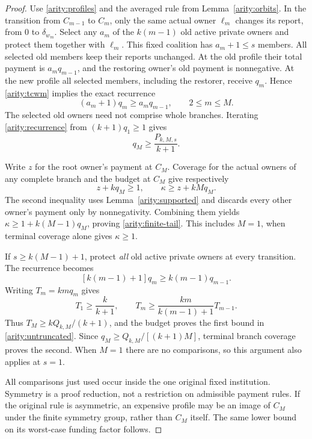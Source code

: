 \documentclass[11pt]{article}
\theoremstyle{definition}\newtheorem{definition}[theorem]{Definition}
\theoremstyle{remark}\newtheorem{remark}[theorem]{Remark}
\begin{document}
\begin{proof}
Use \eqref{arity:profiles} and the averaged rule from
Lemma~\ref{arity:orbits}.  In the transition from $C_{m-1}$ to $C_m$, only
the same actual owner $\ell_m$ changes its report, from $0$ to $\delta_{w_m}$.
Select any $a_m$ of the $k(m-1)$ old active private owners and protect them
together with $\ell_m$.  This fixed coalition has $a_m+1\leq s$ members.
All selected old members keep their reports unchanged.  At the old profile
their total payment is $a_mq_{m-1}$, and the restoring owner's old payment
is nonnegative.  At the new profile all selected members, including the
restorer, receive $q_m$.  Hence \eqref{arity:tcwm} implies the exact recurrence
\begin{equation}
  (a_m+1)q_m\geq a_mq_{m-1},\qquad 2\leq m\leq M.
  \label{arity:recurrence}
\end{equation}
The selected old owners need not comprise whole branches.  Iterating
\eqref{arity:recurrence} from $(k+1)q_1\geq1$ gives
\begin{equation}
  q_M\geq\frac{P_{k,M,s}}{k+1}.
  \label{arity:terminal-q}
\end{equation}

Write $z$ for the root owner's payment at $C_M$.  Coverage for the actual
owners of any complete branch and the budget at $C_M$ give respectively
\[
  z+kq_M\geq1,\qquad
  \kappa\geq z+kMq_M.
\]
The second inequality uses Lemma~\ref{arity:supported} and discards every
other owner's payment only by nonnegativity.  Combining them yields
$\kappa\geq1+k(M-1)q_M$, proving \eqref{arity:finite-tail}.  This includes
$M=1$, when terminal coverage alone gives $\kappa\geq1$.

If $s\geq k(M-1)+1$, protect \emph{all} old active private owners at every
transition.  The recurrence becomes
\[
  [k(m-1)+1]q_m\geq k(m-1)q_{m-1}.
\]
Writing $T_m=kmq_m$ gives
\[
  T_1\geq\frac{k}{k+1},\qquad
  T_m\geq\frac{km}{k(m-1)+1}T_{m-1}.
\]
Thus $T_M\geq kQ_{k,M}/(k+1)$, and the budget proves the first bound in
\eqref{arity:untruncated}.  Since
$q_M\geq Q_{k,M}/[(k+1)M]$, terminal branch coverage proves the second.
When $M=1$ there are no comparisons, so this argument also applies at $s=1$.

All comparisons just used occur inside the one original fixed institution.
Symmetry is a proof reduction, not a restriction on admissible payment
rules.  If the original rule is asymmetric, an expensive profile may be an
image of $C_M$ under the finite symmetry group, rather than $C_M$ itself.
The same lower bound on its worst-case funding factor follows.
\end{proof}
\end{document}
